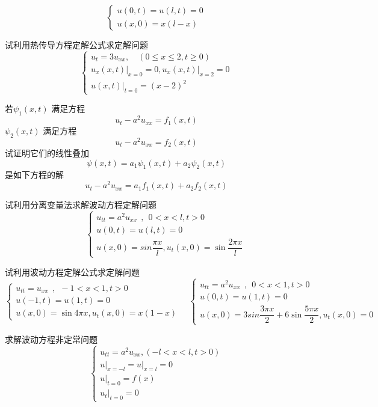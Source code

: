 \begin{Exercises}
$$\begin{cases}
		u(0,t) =u(l,t)=0 \\
		u(x,0) =x (l-x)
	\end{cases} $$
\item 试利用热传导方程定解公式求定解问题 \\
$$
\left\{\begin{array}{l}
u_t=3 u_{x x}, \quad(0 \leqslant x \leqslant 2, t \geqslant 0) \\
\left.u_x(x, t)\right|_{x=0}=0,\left.u_x(x, t)\right|_{x=2}=0 \\
\left.u(x, t)\right|_{t=0}=(x-2)^2
\end{array}\right.
$$
\item 若$\psi _1 (x,t)$ 满足方程
	$$u_{t} - a^2 u_{xx} = f_1(x, t)$$
	$\psi _2 (x,t)$ 满足方程
	$$u_{t} - a^2 u_{xx} = f_2(x, t)$$
	试证明它们的线性叠加
	$$
	\psi (x,t) = a_1\psi _1 (x,t) + a_2\psi _2 (x,t) 
	$$ 是如下方程的解
	$$u_{t} - a^2 u_{xx} = a_1f_1(x, t) + a_2f_2(x, t)$$
\item 试利用分离变量法求解波动方程定解问题 \\
	$$~\qquad \begin{cases}
		u_{tt} =a^2u_{xx} ~~,~~ 0<x<l, t>0\\
		u(0,t) =u(l,t)=0 \\
		u(x,0) =sin \dfrac{\pi x}{l} ,  u_t (x,0)=\sin \dfrac{2\pi x}{l} 
	\end{cases}  $$ 
\item 试利用波动方程定解公式求定解问题 \\
		$$\begin{cases}
			u_{tt} =u_{xx} ~~,~~ -1<x<1, t>0\\
			u(-1,t) =u(1,t)=0  \\
			u(x,0) =\sin 4\pi x ,  u_t (x,0)=x (1-x) 
		\end{cases} \quad \begin{cases}
			u_{tt} =a^2u_{xx} ~~,~~ 0<x<1, t>0\\
			u(0,t) =u(1,t)=0 \\
			u(x,0) =3sin \dfrac{3\pi x}{2} +6\sin\dfrac{5\pi x}{2},  u_t (x,0)=0
		\end{cases} $$ 
\item 求解波动方程非定常问题
$$
\left\{\begin{array}{l}
u_{t t}=a^2 u_{x x},(-l<x<l, t>0) \\
\left.u\right|_{x=-l}=\left.u\right|_{x=l}=0 \\
\left.u\right|_{t=0}= f(x) \\
\left.u_t\right|_{t=0}=0
\end{array}\right.
$$
\end{Exercises}
